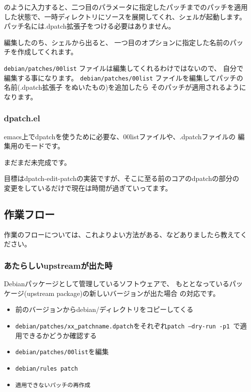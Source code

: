 \documentclass[mingoth]{jsarticle}
\begin{document}
のように入力すると、二つ目のパラメータに指定したパッチまでのパッチを適用
した状態で、一時ディレクトリにソースを展開してくれ、シェルが起動します。
パッチ名には.dpatch拡張子をつける必要はありません。

編集したのち、シェルから出ると、
一つ目のオプションに指定した名前のパッチを作成してくれます。

{\tt debian/patches/00list} ファイルは編集してくれるわけではないので、
自分で編集する事になります。
{\tt debian/patches/00list} ファイルを編集してパッチの名前(.dpatch拡張子
をぬいたもの)を追加したら
そのパッチが適用されるようになります。

\subsubsection{dpatch.el}

emacs上でdpatchを使うために必要な、00listファイルや、.dpatchファイルの
編集用のモードです。

まだまだ未完成です。

目標はdpatch-edit-patchの実装ですが、そこに至る前のコアのdpatchの部分の
変更をしているだけで現在は時間が過ぎていってます。

\subsection{作業フロー}

作業のフローについては、これよりよい方法がある、などありましたら教えてく
ださい。

\subsubsection{あたらしいupstreamが出た時}

Debianパッケージとして管理しているソフトウェアで、
もととなっているパッケージ(upstream package)の新しいバージョンが出た場合
の対応です。

\begin{itemize}
 \item  前のバージョンからdebian/ディレクトリをコピーしてくる
 \item {\tt debian/patches/xx\underline{ }patchname.dpatch}をそれぞれ{\tt  patch --dry-run -p1 }で適用できるかどうか確認する
 \item {\tt debian/patches/00list}を編集
 \item {\tt debian/rules patch}
 \item {\tt 適用できないパッチの再作成}
\end{itemize}
\end{document}
